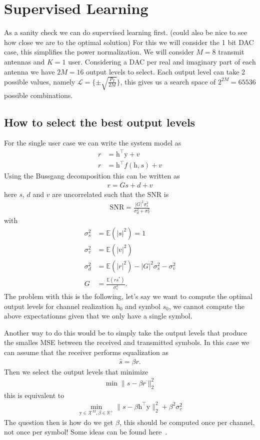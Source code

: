 \documentclass[12pt]{article}
\newcommand{\vect}[1]{\boldsymbol{\mathrm{#1}}}
\newcommand{\expt}[1]{\mathbb{E}\left(#1\right)}
\theoremstyle{remark}
\begin{document}
\section{Supervised Learning}
As a sanity check we can do supervised learning first. (could also be nice to see how close we are to the optimal solution) For this we will consider the 1 bit DAC case, this simplifies the power normalization. We will consider $M=8$ transmit antennas and $K=1$ user. Considering a DAC per real and imaginary part of each antenna we have $2M=16$ output levels to select. Each output level can take 2 possible values, namely  $\mathcal{L} = \{\pm \sqrt{\frac{P_T}{2M}}\}$, this gives us a search space of $2^{2M} = 65536$ possible combinations.

\subsection{How to select the best output levels}
For the single user case we can write the system model as 
\begin{align}
	r &= \vect{h}^{\intercal} \vect{y} + v\\
	r &=  \vect{h}^{\intercal} f(\vect{h}, s) + v
\end{align}
Using the Bussgang decomposition this can be written as 
\begin{align}
	r = Gs + d + v
\end{align}
here $s$, $d$ and $v$ are uncorrelated such that the SNR is
\begin{align}
	\mathrm{SNR} = \frac{|G|^2 \sigma_{s}^2}{\sigma_d^2 + \sigma_v^2}
\end{align}
with
\begin{align}
	\sigma_s^2 &= \expt{|s|^2} = 1\\
	\sigma_v^2 &= \expt{|v|^2}\\
	\sigma_d^2 &= \expt{|r|^2} - |G|^2\sigma_s^2 - \sigma_v^2\\
	G &= \frac{\expt{r s^*}}{\sigma_s^2}.
\end{align}
{\color{red}The problem with this is the following, let's say we want to compute the optimal output levels for channel realization $\vect{h}_0$ and symbol $s_0$, we cannot compute the above expectationns given that we only have a single symbol.}

Another way to do this would be to simply take the output levels that produce the smalles MSE between the received and transmitted symbols. In this case we can assume that the receiver performs equalization as 
\begin{align}
	\hat{s} = \beta r.
\end{align}
Then we select the output levels that minimize
\begin{align}
	\min \|s - \beta r\|_2^2
\end{align}
this is equivalent to
\begin{align}
	\min_{\vect{y}\in \mathcal{X}^M, \beta\in\mathbb{R}^+} \|s - \beta \vect{h}^{\intercal} \vect{y}\|_2^2 + \beta^2 \sigma_v^2
\end{align}
{\color{red}The question then is how do we get $\beta$, this should be computed once per channel, not once per symbol! Some ideas can be found here~\cite{1bit_DACs}.}
\end{document}
